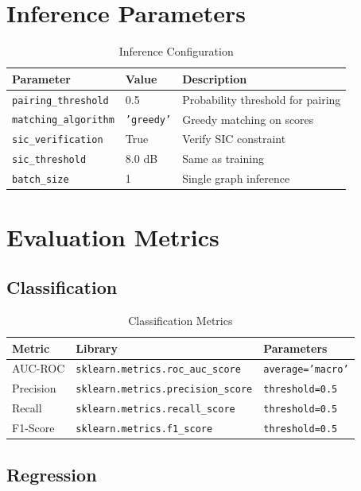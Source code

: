 \section{Inference Parameters}

\begin{table}[H]
\centering
\begin{tabular}{llp{7cm}}
\toprule
\textbf{Parameter} & \textbf{Value} & \textbf{Description} \\
\midrule
\texttt{pairing\_threshold} & 0.5 & Probability threshold for pairing \\
\texttt{matching\_algorithm} & \texttt{'greedy'} & Greedy matching on scores \\
\texttt{sic\_verification} & True & Verify SIC constraint \\
\texttt{sic\_threshold} & 8.0 dB & Same as training \\
\texttt{batch\_size} & 1 & Single graph inference \\
\bottomrule
\end{tabular}
\caption{Inference Configuration}
\end{table}

\section{Evaluation Metrics}

\subsection{Classification}

\begin{table}[H]
\centering
\begin{tabular}{llp{7cm}}
\toprule
\textbf{Metric} & \textbf{Library} & \textbf{Parameters} \\
\midrule
AUC-ROC & \texttt{sklearn.metrics.roc\_auc\_score} & \texttt{average='macro'} \\
Precision & \texttt{sklearn.metrics.precision\_score} & \texttt{threshold=0.5} \\
Recall & \texttt{sklearn.metrics.recall\_score} & \texttt{threshold=0.5} \\
F1-Score & \texttt{sklearn.metrics.f1\_score} & \texttt{threshold=0.5} \\
\bottomrule
\end{tabular}
\caption{Classification Metrics}
\end{table}

\subsection{Regression}

